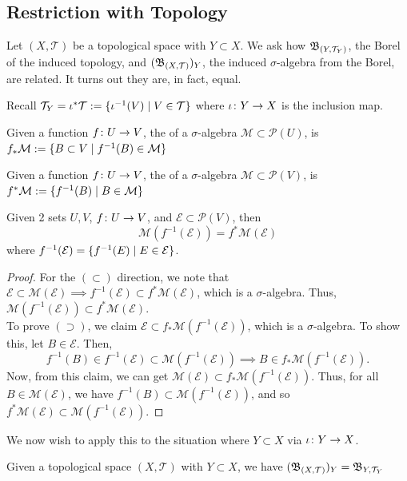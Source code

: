 \documentclass[11pt,leqno,oneside]{amsbook}
\numberwithin{thm}{section}
\renewcommand{\P}{\mathcal{P}}
\newcommand{\M}{\mathcal{M}}
\newcommand{\Ep}{\mathcal{E}}
\newcommand{\Top}{\mathcal{T}} %
\begin{document}
\subsection{Restriction with Topology}
Let \((X,\Top)\) be a topological space with \(Y \subset X\). We ask
how \(\B_{(Y,\Top_Y)}\), the Borel of the induced topology, and
\((\B_{(X,\Top)})_Y\), the induced \(\sigma\)-algebra from the Borel,
are related. It turns out they are, in fact, equal.
\begin{defn}
  Recall \(\Top_Y = \iota^* \Top := \{\iota^{-1}(V) \st V \in \Top\}\)
  where \(\iota \colon Y \to X\) is the inclusion map.
\end{defn}
\begin{defn}
  Given a function \(f \colon U \to V\), the 
    of a \(\sigma\)-algebra \(\M \subset \P(U)\), is \(f_* \M := \{B
  \subset V \st f^{-1}(B) \in \M\}\)
\end{defn}
\begin{defn}
  Given a function \(f \colon U \to V\), the 
    of a \(\sigma\)-algebra \(\M \subset \P(V)\), is \(f^* \M :=
    \{f^{-1}(B) \st B \in \M\}\)
\end{defn}
\begin{prop}
  Given 2 sets \(U,V\), \(f \colon U \to V\), and \(\Ep \subset
  \P(V)\), then \[
    \M(f^{-1}(\Ep)) = f^* \M(\Ep)
  \]
  where \(f^{-1}(\Ep) = \{f^{-1}(E) \st E \in \Ep\}\).
\end{prop}
\begin{proof}
  For the \((\subset)\) direction, we note that \(\Ep \subset \M(\Ep)
  \implies f^{-1}(\Ep) \subset f^* \M(\Ep)\), which is a
  \(\sigma\)-algebra. Thus, \(\M(f^{-1}(\Ep)) \subset f^*
  \M(\Ep)\). \\

  To prove \((\supset)\), we claim \(\Ep \subset f_*
  \M(f^{-1}(\Ep))\), which is a \(\sigma\)-algebra. To show this, let
  \(B \in \Ep\). Then, \[f^{-1}(B) \in f^{-1}(\Ep) \subset
    \M(f^{-1}(\Ep)) \implies B \in f_* \M(f^{-1}(\Ep)).\]
  Now, from this claim, we can get \(\M(\Ep) \subset f_*
  \M(f^{-1}(\Ep))\). Thus, for all \(B \in \M(\Ep)\), we have
  \(f^{-1}(B) \subset \M(f^{-1}(\Ep))\), and so \(f^*\M(\Ep) \subset \M(f^{-1}(\Ep))\).
\end{proof}
We now wish to apply this to the situation where \(Y \subset X\) via
\(\iota \colon Y \to X\).
\begin{cor}
  Given a topological space \((X,\Top)\) with \(Y \subset X\), we have
  \((\B_{(X,\Top)})_Y = \B_{Y,\Top_Y}\)
\end{cor}
\end{document}
